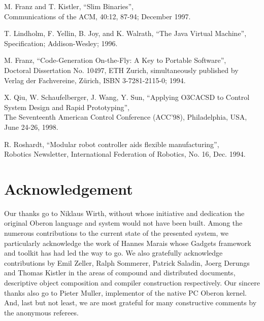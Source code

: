 \begin{thebibliography}{9}
M. Franz and T. Kistler, ``Slim Binaries'',\\
Communications of the ACM, 40:12, 87-94; December 1997.

T. Lindholm, F. Yellin, B. Joy, and K. Walrath, ``The Java Virtual
Machine'',\\
Specification; Addison-Wesley; 1996.

M. Franz, ``Code-Generation On-the-Fly: A Key to Portable Software'',\\
Doctoral Dissertation No. 10497, ETH Zurich, simultaneously published by
Verlag der Fachvereine, Z\"urich, ISBN 3-7281-2115-0; 1994.

X. Qiu, W. Schaufelberger, J. Wang, Y. Sun, ``Applying O3CACSD to
Control System Design and Rapid Prototyping'',\\
The Seventeenth American Control Conference (ACC'98), Philadelphia, USA,
June 24-26, 1998.

R. Roshardt, ``Modular robot controller aids flexible manufacturing'',\\
Robotics Newsletter, International Federation of Robotics, No. 16, Dec. 1994.
\end{thebibliography}

\section*{Acknowledgement}

Our thanks go to Niklaus Wirth, without whose initiative and dedication
the original Oberon language and system would not have been built.
Among the numerous contributions to the current state of the presented
system, we particularly acknowledge the work of Hannes Marais whose
Gadgets framework and toolkit has had led the way to go. We also gratefully
acknowledge contributions by Emil Zeller, Ralph Sommerer, Patrick Saladin,
Joerg Derungs and Thomas Kistler in the areas of compound and distributed
documents, descriptive object composition and compiler construction
respectively. Our sincere thanks also go to Pieter Muller, implementor
of the native PC Oberon kernel. And, last but not least, we are most
grateful for many constructive comments by the anonymous referees.


